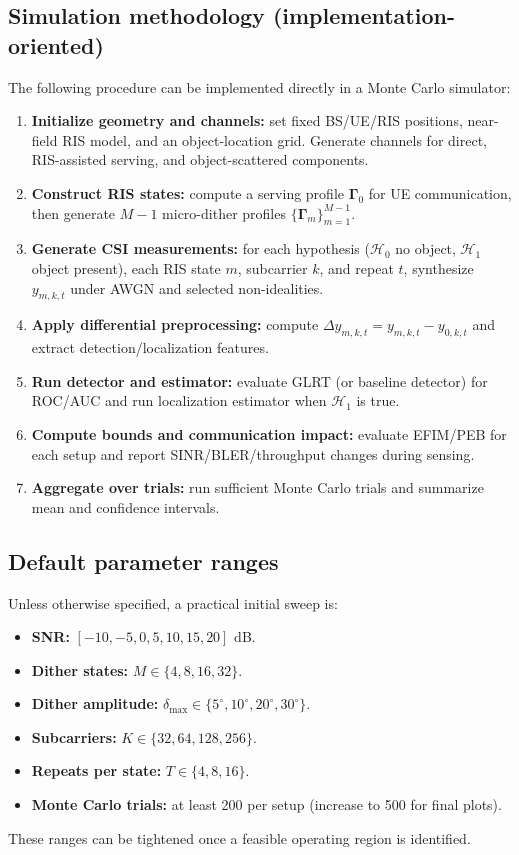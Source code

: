 \documentclass[11pt,a4paper]{article}
\begin{document}
\subsection{Simulation methodology (implementation-oriented)}
The following procedure can be implemented directly in a Monte Carlo simulator:
\begin{enumerate}
\item \textbf{Initialize geometry and channels:} set fixed BS/UE/RIS positions, near-field RIS model, and an object-location grid. Generate channels for direct, RIS-assisted serving, and object-scattered components.
\item \textbf{Construct RIS states:} compute a serving profile $\bm{\Gamma}_0$ for UE communication, then generate $M-1$ micro-dither profiles $\{\bm{\Gamma}_m\}_{m=1}^{M-1}$.
\item \textbf{Generate CSI measurements:} for each hypothesis ($\mathcal{H}_0$ no object, $\mathcal{H}_1$ object present), each RIS state $m$, subcarrier $k$, and repeat $t$, synthesize $y_{m,k,t}$ under AWGN and selected non-idealities.
\item \textbf{Apply differential preprocessing:} compute $\Delta y_{m,k,t}=y_{m,k,t}-y_{0,k,t}$ and extract detection/localization features.
\item \textbf{Run detector and estimator:} evaluate GLRT (or baseline detector) for ROC/AUC and run localization estimator when $\mathcal{H}_1$ is true.
\item \textbf{Compute bounds and communication impact:} evaluate EFIM/PEB for each setup and report SINR/BLER/throughput changes during sensing.
\item \textbf{Aggregate over trials:} run sufficient Monte Carlo trials and summarize mean and confidence intervals.
\end{enumerate}

\subsection{Default parameter ranges}
Unless otherwise specified, a practical initial sweep is:
\begin{itemize}
\item \textbf{SNR:} $[-10, -5, 0, 5, 10, 15, 20]$ dB.
\item \textbf{Dither states:} $M \in \{4, 8, 16, 32\}$.
\item \textbf{Dither amplitude:} $\delta_{\max} \in \{5^\circ, 10^\circ, 20^\circ, 30^\circ\}$.
\item \textbf{Subcarriers:} $K \in \{32, 64, 128, 256\}$.
\item \textbf{Repeats per state:} $T \in \{4, 8, 16\}$.
\item \textbf{Monte Carlo trials:} at least 200 per setup (increase to 500 for final plots).
\end{itemize}
These ranges can be tightened once a feasible operating region is identified.
\end{document}
